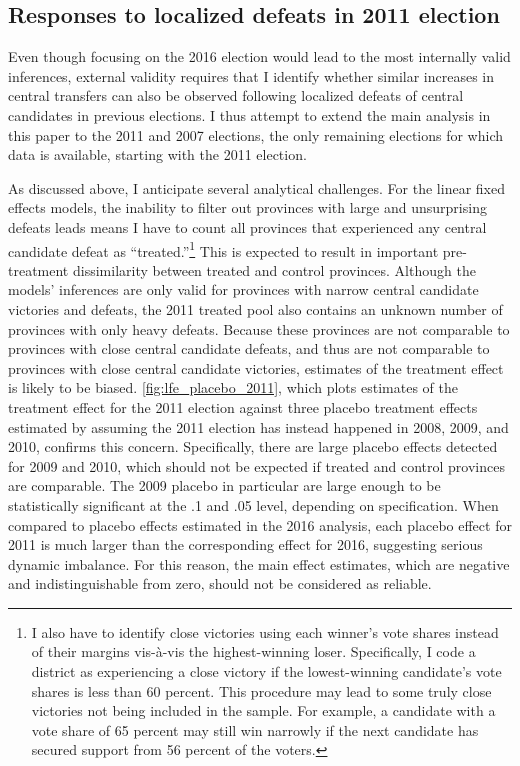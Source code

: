 \documentclass[12pt]{article}
\newcommand{\1}{\mathbbm{1}}
\begin{document}
\subsection{Responses to localized defeats in 2011 election}

Even though focusing on the 2016 election would lead to the most internally valid inferences, external validity requires that I identify whether similar increases in central transfers can also be observed following localized defeats of central candidates in previous elections. I thus attempt to extend the main analysis in this paper to the 2011 and 2007 elections, the only remaining elections for which data is available, starting with the 2011 election.

As discussed above, I anticipate several analytical challenges. For the linear fixed effects models, the inability to filter out provinces with large and unsurprising defeats leads means I have to count all provinces that experienced any central candidate defeat as ``treated.''\footnote{I also have to identify close victories using each winner's vote shares instead of their margins vis-\`{a}-vis the highest-winning loser. Specifically, I code a district as experiencing a close victory if the lowest-winning candidate's vote shares is less than 60 percent. This procedure may lead to some truly close victories not being included in the sample. For example, a candidate with a vote share of 65 percent may still win narrowly if the next candidate has secured support from 56 percent of the voters.} This is expected to result in important pre-treatment dissimilarity between treated and control provinces. Although the models' inferences are only valid for provinces with narrow central candidate victories and defeats, the 2011 treated pool also contains an unknown number of provinces with only heavy defeats. Because these provinces are not comparable to provinces with close central candidate defeats, and thus are not comparable to provinces with close central candidate victories, estimates of the treatment effect is likely to be biased. \autoref{fig:lfe_placebo_2011}, which plots estimates of the treatment effect for the 2011 election against three placebo treatment effects estimated by assuming the 2011 election has instead happened in 2008, 2009, and 2010, confirms this concern. Specifically, there are large placebo effects detected for 2009 and 2010, which should not be expected if treated and control provinces are comparable. The 2009 placebo in particular are large enough to be statistically significant at the .1 and .05 level, depending on specification. When compared to placebo effects estimated in the 2016 analysis, each placebo effect for 2011 is much larger than the corresponding effect for 2016, suggesting serious dynamic imbalance. For this reason, the main effect estimates, which are negative and indistinguishable from zero, should not be considered as reliable.
\end{document}

